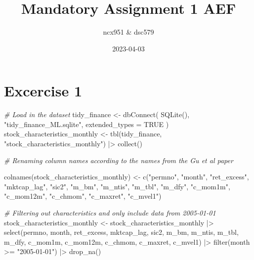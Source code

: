 \documentclass[
]{article}
\title{Mandatory Assignment 1 AEF}
\author{ncx951 \& dsc579}
\date{2023-04-03}
\newenvironment{Shaded}{\begin{snugshade}}{\end{snugshade}}
\newcommand{\AttributeTok}[1]{\textcolor[rgb]{0.77,0.63,0.00}{#1}}
\newcommand{\CommentTok}[1]{\textcolor[rgb]{0.56,0.35,0.01}{\textit{#1}}}
\newcommand{\ConstantTok}[1]{\textcolor[rgb]{0.00,0.00,0.00}{#1}}
\newcommand{\FunctionTok}[1]{\textcolor[rgb]{0.00,0.00,0.00}{#1}}
\newcommand{\NormalTok}[1]{#1}
\newcommand{\OtherTok}[1]{\textcolor[rgb]{0.56,0.35,0.01}{#1}}
\newcommand{\SpecialCharTok}[1]{\textcolor[rgb]{0.00,0.00,0.00}{#1}}
\newcommand{\StringTok}[1]{\textcolor[rgb]{0.31,0.60,0.02}{#1}}
\begin{document}
\maketitle

\hypertarget{excercise-1}{%
\section{Excercise 1}\label{excercise-1}}

\begin{Shaded}
\begin{Highlighting}[]
\CommentTok{\# Load in the dataset}
\NormalTok{tidy\_finance }\OtherTok{\textless{}{-}} \FunctionTok{dbConnect}\NormalTok{(}
  \FunctionTok{SQLite}\NormalTok{(),}
  \StringTok{"tidy\_finance\_ML.sqlite"}\NormalTok{,}
  \AttributeTok{extended\_types =} \ConstantTok{TRUE}
\NormalTok{)}
\NormalTok{stock\_characteristics\_monthly }\OtherTok{\textless{}{-}} \FunctionTok{tbl}\NormalTok{(tidy\_finance, }\StringTok{"stock\_characteristics\_monthly"}\NormalTok{) }\SpecialCharTok{|\textgreater{}} \FunctionTok{collect}\NormalTok{()}

\CommentTok{\# Renaming column names according to the names from the Gu et al paper}

\FunctionTok{colnames}\NormalTok{(stock\_characteristics\_monthly) }\OtherTok{\textless{}{-}} \FunctionTok{c}\NormalTok{(}\StringTok{"permno"}\NormalTok{, }\StringTok{"month"}\NormalTok{, }\StringTok{"ret\_excess"}\NormalTok{, }\StringTok{"mktcap\_lag"}\NormalTok{, }\StringTok{"sic2"}\NormalTok{, }
                                             \StringTok{"m\_bm"}\NormalTok{, }\StringTok{"m\_ntis"}\NormalTok{, }\StringTok{"m\_tbl"}\NormalTok{, }\StringTok{"m\_dfy"}\NormalTok{,}
                                             \StringTok{"c\_mom1m"}\NormalTok{, }\StringTok{"c\_mom12m"}\NormalTok{, }\StringTok{"c\_chmom"}\NormalTok{, }\StringTok{"c\_maxret"}\NormalTok{, }\StringTok{"c\_mvel1"}\NormalTok{)}


\CommentTok{\# Filtering out characteristics and only include data from 2005{-}01{-}01}
\NormalTok{stock\_characteristics\_monthly }\OtherTok{\textless{}{-}}\NormalTok{ stock\_characteristics\_monthly }\SpecialCharTok{|\textgreater{}}
               \FunctionTok{select}\NormalTok{(permno, month, ret\_excess, mktcap\_lag, sic2, }
\NormalTok{                      m\_bm, m\_ntis, m\_tbl, m\_dfy, }
\NormalTok{                      c\_mom1m, c\_mom12m, c\_chmom, c\_maxret, c\_mvel1) }\SpecialCharTok{|\textgreater{}}     
               \FunctionTok{filter}\NormalTok{(month }\SpecialCharTok{\textgreater{}=} \StringTok{"2005{-}01{-}01"}\NormalTok{) }\SpecialCharTok{|\textgreater{}}
               \FunctionTok{drop\_na}\NormalTok{()}


\end{Highlighting}
\end{Shaded}
\end{document}
